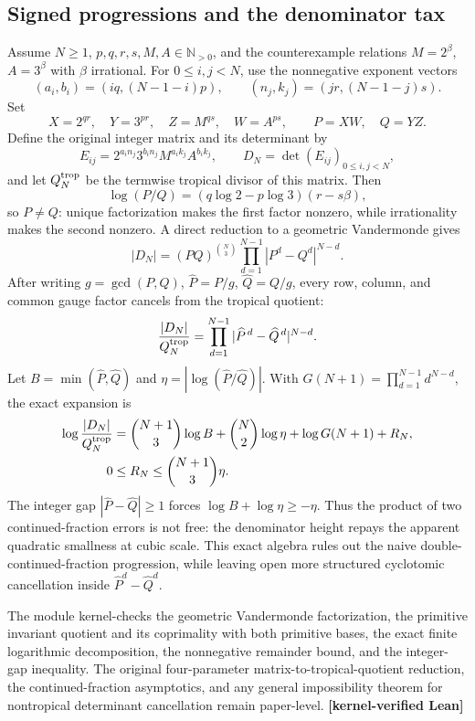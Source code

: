 \documentclass[11pt,oneside]{article}
\theoremstyle{definition}
\theoremstyle{remark}
\newcommand{\N}{\mathbb N}
\newcommand{\lean}[1]{\texttt{\detokenize{#1}}}
\newcommand{\statuslean}{\textcolor{leanblue}{\textbf{[kernel-verified Lean]}}}
\begin{document}
\subsection{Signed progressions and the denominator tax}
\label{fc:signed-progressions}

Assume $N\ge1$, $p,q,r,s,M,A\in\N_{>0}$, and the counterexample relations
$M=2^\beta$, $A=3^\beta$ with $\beta$ irrational.  For $0\le i,j<N$, use the nonnegative exponent vectors
\[
 (a_i,b_i)=(iq,(N-1-i)p),\qquad
 (n_j,k_j)=(jr,(N-1-j)s).
\]
Set
\[
 X=2^{qr},\quad Y=3^{pr},\quad Z=M^{qs},\quad W=A^{ps},
 \qquad P=XW,\quad Q=YZ.
\]
Define the original integer matrix and its determinant by
\[
 E_{ij}=2^{a_in_j}3^{b_in_j}M^{a_ik_j}A^{b_ik_j},
 \qquad D_N=\det(E_{ij})_{0\le i,j<N},
\]
and let $Q_N^{\rm trop}$ be the termwise tropical divisor of this matrix.
Then
\[
\log(P/Q)=(q\log2-p\log3)(r-s\beta),
\]
so $P\ne Q$: unique factorization makes the first factor nonzero, while irrationality makes
the second nonzero.  A direct reduction to a geometric Vandermonde gives
\begin{equation}
 |D_N|=(PQ)^{\binom N3}
 \prod_{d=1}^{N-1}|P^d-Q^d|^{N-d}.
 \label{fc:eq-signed-progression}
\end{equation}
After writing $g=\gcd(P,Q)$, $\widehat P=P/g$, $\widehat Q=Q/g$, every row, column, and common
gauge factor cancels from the tropical quotient:
\begin{equation}
 \frac{|D_N|}{Q_N^{\rm trop}}
 =\prod_{d=1}^{N-1}|\widehat P^{\,d}-\widehat Q^{\,d}|^{N-d}.
 \label{fc:eq-progression-quotient}
\end{equation}
Let $B=\min(\widehat P,\widehat Q)$ and
$\eta=|\log(\widehat P/\widehat Q)|$.  With
$G(N+1)=\prod_{d=1}^{N-1}d^{N-d}$, the exact expansion is
\begin{align}
 \log\frac{|D_N|}{Q_N^{\rm trop}}
 &=\binom{N+1}{3}\log B+\binom N2\log\eta+\log G(N+1)+R_N,\label{fc:eq-tax}\\
 0&\le R_N\le\binom{N+1}{3}\eta.
\end{align}
The integer gap $|\widehat P-\widehat Q|\ge1$ forces
$\log B+\log\eta\ge-\eta$.  Thus the product of two continued-fraction errors is not free:
the denominator height repays the apparent quadratic smallness at cubic scale.  This exact
algebra rules out the naive double-continued-fraction progression, while leaving open more
structured cyclotomic cancellation inside $\widehat P^d-\widehat Q^d$.

The module \lean{SignedProgressionDeterminant} kernel-checks the geometric Vandermonde
factorization, the primitive invariant quotient and its coprimality with both primitive
bases, the exact finite logarithmic decomposition, the nonnegative remainder bound, and the
integer-gap inequality.  The original four-parameter matrix-to-tropical-quotient reduction,
the continued-fraction asymptotics, and any general impossibility theorem for nontropical
determinant cancellation remain paper-level.  \statuslean
\end{document}
